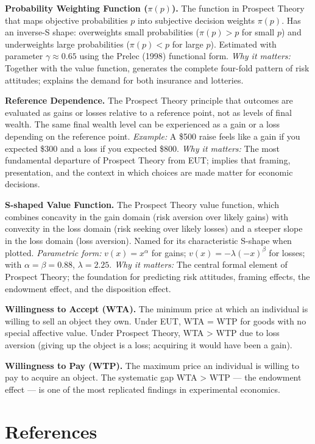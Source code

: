 \documentclass[12pt, letterpaper]{article}
\begin{document}
\textbf{Probability Weighting Function ($\pi(p)$).} The function in Prospect Theory that maps objective probabilities $p$ into subjective decision weights $\pi(p)$. Has an inverse-S shape: overweights small probabilities ($\pi(p) > p$ for small $p$) and underweights large probabilities ($\pi(p) < p$ for large $p$). Estimated with parameter $\gamma \approx 0.65$ using the Prelec (1998) functional form. \textit{Why it matters:} Together with the value function, generates the complete four-fold pattern of risk attitudes; explains the demand for both insurance and lotteries.

\textbf{Reference Dependence.} The Prospect Theory principle that outcomes are evaluated as gains or losses relative to a reference point, not as levels of final wealth. The same final wealth level can be experienced as a gain or a loss depending on the reference point. \textit{Example:} A \$500 raise feels like a gain if you expected \$300 and a loss if you expected \$800. \textit{Why it matters:} The most fundamental departure of Prospect Theory from EUT; implies that framing, presentation, and the context in which choices are made matter for economic decisions.

\textbf{S-shaped Value Function.} The Prospect Theory value function, which combines concavity in the gain domain (risk aversion over likely gains) with convexity in the loss domain (risk seeking over likely losses) and a steeper slope in the loss domain (loss aversion). Named for its characteristic S-shape when plotted. \textit{Parametric form:} $v(x) = x^\alpha$ for gains; $v(x) = -\lambda(-x)^\beta$ for losses; with $\alpha = \beta = 0.88$, $\lambda = 2.25$. \textit{Why it matters:} The central formal element of Prospect Theory; the foundation for predicting risk attitudes, framing effects, the endowment effect, and the disposition effect.

\textbf{Willingness to Accept (WTA).} The minimum price at which an individual is willing to sell an object they own. Under EUT, WTA = WTP for goods with no special affective value. Under Prospect Theory, WTA > WTP due to loss aversion (giving up the object is a loss; acquiring it would have been a gain).

\textbf{Willingness to Pay (WTP).} The maximum price an individual is willing to pay to acquire an object. The systematic gap WTA > WTP --- the endowment effect --- is one of the most replicated findings in experimental economics.

\medskip


\section*{References}
\end{document}
